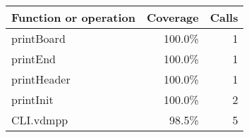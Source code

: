 \bigskip
\begin{longtable}{|l|r|r|}
\hline
Function or operation & Coverage & Calls \\
\hline
\hline
printBoard & 100.0\% & 1 \\
\hline
printEnd & 100.0\% & 1 \\
\hline
printHeader & 100.0\% & 1 \\
\hline
printInit & 100.0\% & 2 \\
\hline
\hline
CLI.vdmpp & 98.5\% & 5 \\
\hline
\end{longtable}

